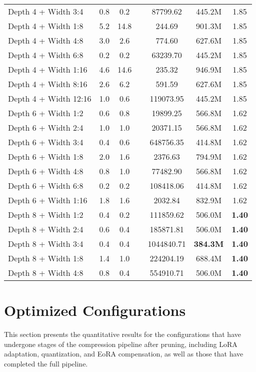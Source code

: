 {\begin{longtable}{lcccccc}
Depth 4 + Width 3:4 & 0.8 & 0.2 & & 87799.62 & 445.2M & 1.85 \\
Depth 4 + Width 1:8 & 5.2 & 14.8 & & 244.69 & 901.3M & 1.85 \\
Depth 4 + Width 4:8 & 3.0 & 2.6 & & 774.60 & 627.6M & 1.85 \\
Depth 4 + Width 6:8 & 0.2 & 0.2 & & 63239.70 & 445.2M & 1.85 \\
Depth 4 + Width 1:16 & 4.6 & 14.6 & & 235.32 & 946.9M & 1.85 \\
Depth 4 + Width 8:16 & 2.6 & 6.2 & & 591.59 & 627.6M & 1.85 \\
Depth 4 + Width 12:16 & 1.0 & 0.6 & & 119073.95 & 445.2M & 1.85 \\
Depth 6 + Width 1:2 & 0.6 & 0.8 & & 19899.25 & 566.8M & 1.62 \\
Depth 6 + Width 2:4 & 1.0 & 1.0 & & 20371.15 & 566.8M & 1.62 \\
Depth 6 + Width 3:4 & 0.4 & 0.6 & & 648756.35 & 414.8M & 1.62 \\
Depth 6 + Width 1:8 & 2.0 & 1.6 & & 2376.63 & 794.9M & 1.62 \\
Depth 6 + Width 4:8 & 0.8 & 1.0 & & 77482.90 & 566.8M & 1.62 \\
Depth 6 + Width 6:8 & 0.2 & 0.2 & & 108418.06 & 414.8M & 1.62 \\
Depth 6 + Width 1:16 & 1.8 & 1.6 & & 2032.84 & 832.9M & 1.62 \\
Depth 8 + Width 1:2 & 0.4 & 0.2 & & 111859.62 & 506.0M &  \textbf{1.40} \\
Depth 8 + Width 2:4 & 0.6 & 0.4 & & 185871.81 & 506.0M &  \textbf{1.40} \\
Depth 8 + Width 3:4 & 0.4 & 0.4 & & 1044840.71 & \textbf{384.3M} & \textbf{1.40} \\
Depth 8 + Width 1:8 & 1.4 & 1.0 & & 224204.19 & 688.4M &  \textbf{1.40} \\
Depth 8 + Width 4:8 & 0.8 & 0.4 & & 554910.71 & 506.0M &  \textbf{1.40} \\
\end{longtable}
}
\normalsize

\section{Optimized Configurations}

This section presents the quantitative results for the configurations that have undergone stages of the compression pipeline after pruning, including LoRA adaptation, quantization, and EoRA compensation, as well as those that have completed the full pipeline.

